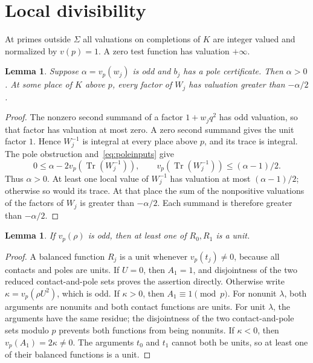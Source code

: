 \documentclass[11pt,a4paper]{article}
\newtheorem{lemma}[theorem]{Lemma}
\DeclareMathOperator{\Tr}{Tr}\DeclareMathOperator{\Nm}{N}
\begin{document}
\section{Local divisibility}

At primes outside $\Sigma$ all valuations on completions of $K$
are integer valued and normalized by $v(p)=1$. A zero test function
has valuation $+\infty$.

\begin{lemma}\label{lem:trace}
Suppose $\alpha=v_p(w_j)$ is odd and $b_j$ has a pole certificate.
Then $\alpha>0$. At some place of $K$ above $p$, every factor
of $W_j$ has valuation greater than $-\alpha/2$.
\end{lemma}
\begin{proof}
The nonzero second summand of a factor $1+w_jq^2$ has odd
valuation, so that factor has valuation at most zero. A zero second
summand gives the unit factor $1$. Hence $W_j^{-1}$ is integral at
every place above $p$, and its trace is integral. The pole obstruction
and~\eqref{eq:poleinputs} give
\[
 0\le\alpha-2v_p(\Tr(W_j^{-1})),\qquad
 v_p(\Tr(W_j^{-1}))\le(\alpha-1)/2.
\]
Thus $\alpha>0$. At least one local value of $W_j^{-1}$ has
valuation at most $(\alpha-1)/2$; otherwise so would its trace.
At that place the sum of the nonpositive valuations of the factors
of $W_j$ is greater than $-\alpha/2$. Each summand is therefore
greater than $-\alpha/2$.
\end{proof}

\begin{lemma}\label{lem:unit}
If $v_p(\rho)$ is odd, then at least one of $R_0,R_1$ is a unit.
\end{lemma}
\begin{proof}
A balanced function $R_j$ is a unit whenever $v_p(t_j)\ne0$,
because all contacts and poles are units. If $U=0$, then
$A_1=1$, and disjointness of the two reduced contact-and-pole sets
proves the assertion directly. Otherwise write
$\kappa=v_p(\rho U^2)$, which is odd. If $\kappa>0$, then
$A_1\equiv1\pmod p$. For nonunit $\lambda$, both arguments
are nonunits and both contact functions are units. For unit
$\lambda$, the arguments have the same residue; the disjointness
of the two contact-and-pole sets modulo $p$ prevents both functions
from being nonunits. If $\kappa<0$, then $v_p(A_1)=2\kappa\ne0$.
The arguments $t_0$ and $t_1$ cannot both be units, so at least one
of their balanced functions is a unit.
\end{proof}
\end{document}
